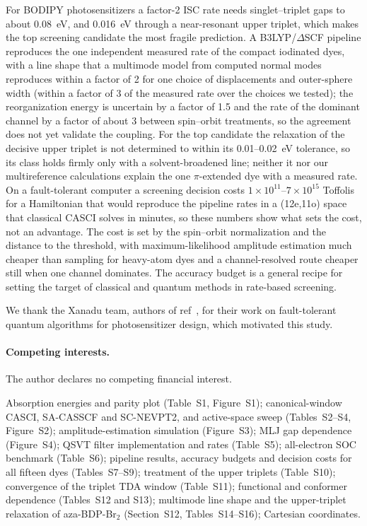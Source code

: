 \documentclass[journal=jctcce,manuscript=article]{achemso}
\begin{document}
For BODIPY photosensitizers a factor-2 ISC rate needs singlet--triplet gaps to about 0.08~eV, and 0.016~eV
through a near-resonant upper triplet, which makes the top screening candidate the most fragile prediction. A
B3LYP/$\Delta$SCF pipeline reproduces the one independent measured rate of the compact iodinated dyes, with a line shape that a
multimode model from computed normal modes reproduces within a factor of 2 for one choice of displacements and
outer-sphere width (within a factor of 3 of the measured rate over the choices we tested); the reorganization energy is uncertain by a
factor of 1.5 and the rate of the dominant channel by a factor of about 3 between spin--orbit treatments, so the
agreement does not yet validate the coupling. For the top candidate the relaxation of the decisive upper triplet is
not determined to within its 0.01--0.02~eV tolerance, so its class holds firmly only with a solvent-broadened line; neither it nor our multireference
calculations explain the one $\pi$-extended dye with a measured rate. On a fault-tolerant computer a screening
decision costs $1\times10^{11}$--$7\times10^{15}$ Toffolis for a Hamiltonian that would reproduce the pipeline rates
in a (12e,11o) space that classical CASCI solves in minutes, so these numbers show what sets the cost, not an
advantage. The cost is set by the spin--orbit normalization and the distance to the threshold, with maximum-likelihood amplitude estimation
much cheaper than sampling for heavy-atom dyes and a channel-resolved route cheaper
still when one channel dominates. The accuracy budget is a general recipe for setting the target of classical
and quantum methods in rate-based screening.

\begin{acknowledgement}
We thank the Xanadu team, authors of ref~, for their work on fault-tolerant
quantum algorithms for photosensitizer design, which motivated this study.
\end{acknowledgement}

\paragraph{Competing interests.} The author declares no competing financial interest.

\begin{suppinfo}
\sloppy
Absorption energies and parity plot (Table~S1, Figure~S1); canonical-window CASCI, SA-CASSCF and SC-NEVPT2, and
active-space sweep (Tables~S2--S4, Figure~S2); amplitude-estimation simulation (Figure~S3); MLJ gap dependence
(Figure~S4); QSVT filter implementation and rates (Table~S5); all-electron SOC benchmark (Table~S6); pipeline results, accuracy
budgets and decision costs for all fifteen dyes (Tables~S7--S9); treatment of the upper triplets (Table~S10); convergence of the triplet TDA window (Table~S11);
functional and conformer dependence (Tables~S12 and S13); multimode line shape and the upper-triplet relaxation of aza-BDP-Br$_2$ (Section~S12, Tables~S14--S16);
Cartesian coordinates.
\end{suppinfo}
\end{document}
